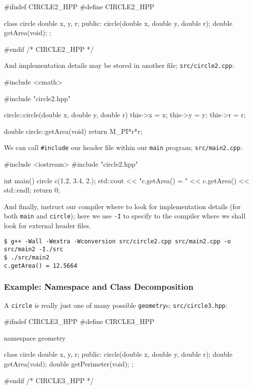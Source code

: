 \documentclass[12pt,letterpaper,twoside]{article}
\begin{document}
\begin{cpp}
#ifndef CIRCLE2_HPP
#define CIRCLE2_HPP

class circle {
  double x, y, r;
 public:
  circle(double x, double y, double r);
  double getArea(void);
};

#endif /* CIRCLE2_HPP */
\end{cpp}

And implementation details may be stored in another file;
\texttt{src/circle2.cpp}:

\begin{cpp}
#include <cmath>

#include "circle2.hpp"

circle::circle(double x, double y, double r) {
  this->x = x;
  this->y = y;
  this->r = r;
}

double circle::getArea(void) {
  return M_PI*r*r;
}
\end{cpp}

We can call \texttt{\#include} our header file within our \texttt{main}
program;
\texttt{src/main2.cpp}:

\begin{cpp}
#include <iostream>
#include "circle2.hpp"

int main() {
  circle c(1.2, 3.4, 2.);
  std::cout << "c.getArea() = " << c.getArea() << std::endl;
  return 0;
}
\end{cpp}

And finally, instruct our compiler where to look for implementation details
(for both \texttt{main} and \texttt{circle}); here we use \texttt{-I} to specify
to the compiler where we shall look for external header files.
\begin{verbatim}
$ g++ -Wall -Wextra -Wconversion src/circle2.cpp src/main2.cpp -o src/main2 -I./src
$ ./src/main2
c.getArea() = 12.5664
\end{verbatim}

\subsubsection{Example: Namespace and Class Decomposition}

A \texttt{circle} is really just one of many possible \texttt{geometry}s;
\texttt{src/circle3.hpp}:
\begin{cpp}
#ifndef CIRCLE3_HPP
#define CIRCLE3_HPP

namespace geometry {

  class circle {
      double x, y, r;
    public:
      circle(double x, double y, double r);
      double getArea(void);
      double getPerimeter(void); 
  };
}
#endif /* CIRCLE3_HPP */
\end{cpp}
\end{document}
